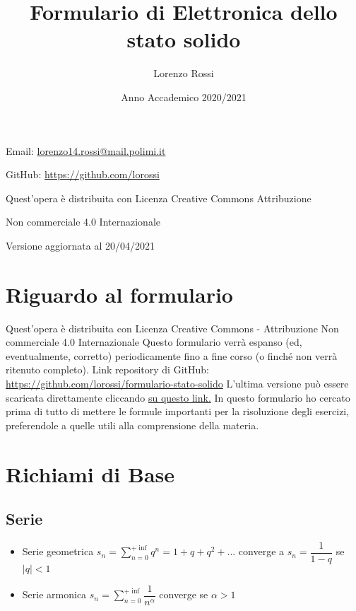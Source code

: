 \documentclass{article}
\title{\Huge Formulario di Elettronica dello stato solido}
\author{\LARGE Lorenzo Rossi}
\date{\LARGE Anno Accademico 2020/2021}
\begin{document}
\maketitle

\vspace{18em}

\large
\begin{doublespacing}\hypersetup{
    urlcolor=black,
  }
  \centerline{Email: \href{mailto://lorenzo14.rossi@mail.polimi.it}{lorenzo14.rossi@mail.polimi.it}}
  \centerline{GitHub: \url{https://github.com/lorossi}}

  \vspace{18em}
  \centerline{Quest'opera è distribuita con Licenza Creative Commons Attribuzione}
  \centerline{Non commerciale 4.0 Internazionale \ccbynceu}
  \centerline{Versione aggiornata al 20/04/2021}
\end{doublespacing}
\newpage


\tableofcontents
\clearpage
{}
\newpage

\section{Riguardo al formulario}
Quest'opera è distribuita con Licenza Creative Commons - Attribuzione Non commerciale 4.0 Internazionale \ccbynceu \newline
Questo formulario verrà espanso (ed, eventualmente, corretto) periodicamente fino a fine corso (o finché non verrà ritenuto completo). \newline
Link repository di GitHub: \url{https://github.com/lorossi/formulario-stato-solido} \newline
L'ultima versione può essere scaricata direttamente cliccando \href{https://github.com/lorossi/formulario-stato-solido/raw/master/formulario-elettronica-dello-stato-solido.pdf}{su questo link.} \newline
In questo formulario ho cercato prima di tutto di mettere le formule importanti per la risoluzione degli esercizi, preferendole a quelle utili alla comprensione della materia.

\section{Richiami di Base}
\subsection{Serie}
\begin{itemize}
  \item Serie geometrica \( \displaystyle  s_n = \sum_{n=0}^{+\inf} q^n = 1 + q + q^2 + ... \) converge a \( s_n = \dfrac{1}{1-q} \) se \( |q| < 1 \)
  \item Serie armonica \( \displaystyle s_n = \sum_{n=0}^{+\inf} \dfrac{1}{n ^ \alpha} \) converge se \( \alpha > 1 \)
\end{itemize}
\end{document}
